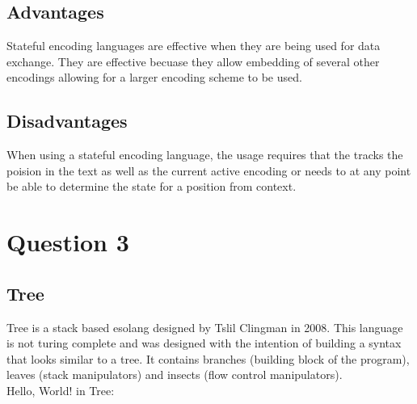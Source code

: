 \documentclass{article}
\begin{document}
        \subsection{Advantages}
        Stateful encoding languages are effective when they are being used for data exchange. They are effective becuase they allow embedding of
        several other encodings allowing for a larger encoding scheme to be used. \cite{IBM:stateful}

        \subsection{Disadvantages}
        When using a stateful encoding language, the usage requires that the tracks the poision in the text as well as the current active
        encoding or needs to at any point be able to determine the state for a position from context. \cite{IBM:stateful}

\clearpage
\section*{Question 3}

\subsection*{Tree}
Tree is a stack based esolang designed by Tslil Clingman in 2008. This language is not turing complete and was designed with the intention of building a syntax
that looks similar to a tree. It contains branches (building block of the program), leaves (stack manipulators) and insects (flow control manipulators). \cite{Tree}\\

Hello, World! in Tree:
\end{document}
